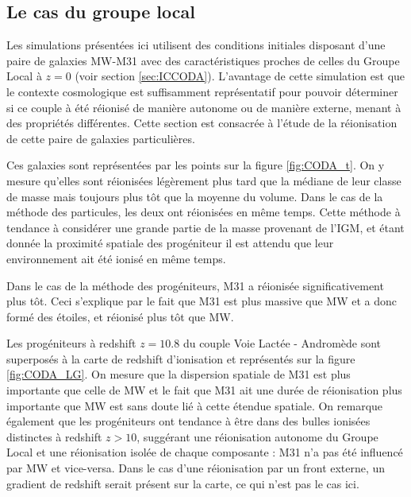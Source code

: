 \subsection{Le cas du groupe local}

Les simulations présentées ici utilisent des conditions initiales disposant d'une paire de galaxies MW-M31 avec des caractéristiques proches de celles du Groupe Local  à $z=0$ (voir section \ref{sec:ICCODA}).
L'avantage de cette simulation est que le contexte cosmologique est suffisamment représentatif pour pouvoir déterminer si ce couple à été réionisé de manière autonome ou de manière externe, menant à des propriétés différentes.
Cette section est consacrée à l'étude de la réionisation de cette paire de galaxies particulières.

Ces galaxies sont représentées par les points sur la figure \ref{fig:CODA_t}. 
On y mesure qu'elles sont réionisées légèrement plus tard que la médiane de leur classe de masse mais toujours plus tôt que la moyenne du volume.
Dans le cas de la méthode des particules, les deux ont réionisées en même temps.
Cette méthode à tendance à considérer une grande partie de la masse provenant de l'\ac{IGM}, et étant donnée la proximité spatiale des progéniteur il est attendu que leur environnement ait été ionisé en même temps.

Dans le cas de la méthode des progéniteurs, M31 a réionisée significativement plus tôt.
Ceci s'explique par le fait que M31 est plus massive que MW %
et a donc formé des étoiles, et réionisé plus tôt que MW.



Les progéniteurs à redshift $z=10.8$ du couple Voie Lactée - Andromède sont superposés à la carte de redshift d'ionisation et représentés sur la figure \ref{fig:CODA_LG}.
On mesure que la dispersion spatiale de M31 est plus importante que celle de MW et le fait que M31 ait une durée de réionisation plus importante que MW est sans doute lié à cette étendue spatiale.
On remarque également que les progéniteurs ont tendance à être dans des bulles ionisées distinctes à redshift $z>10$, suggérant une réionisation autonome du Groupe Local et une réionisation isolée de chaque composante : M31 n'a pas été influencé par MW et vice-versa.
Dans le cas d'une réionisation par un front externe, un gradient de redshift serait présent sur la carte, ce qui n'est pas le cas ici.

